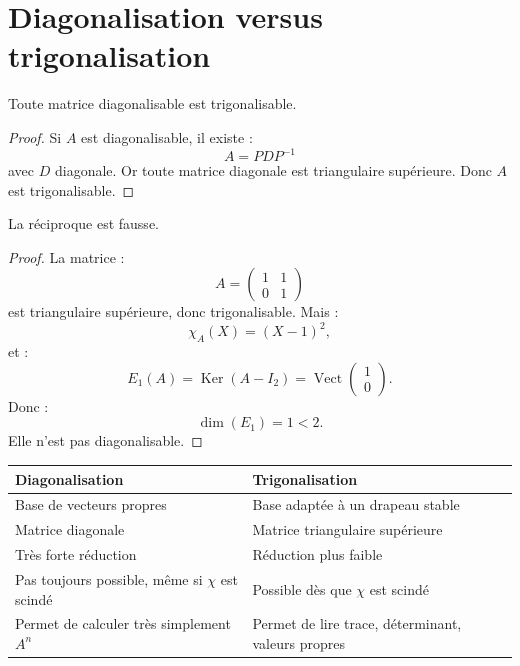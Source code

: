 \documentclass[11pt,a4paper]{article}
\newcommand{\Vect}{\operatorname{Vect}}
\newcommand{\Ker}{\operatorname{Ker}}
\begin{document}
\section{Diagonalisation versus trigonalisation}

\begin{theorembox}
Toute matrice diagonalisable est trigonalisable.
\end{theorembox}

\begin{proof}
Si \(A\) est diagonalisable, il existe :
\[
A=PDP^{-1}
\]
avec \(D\) diagonale.  
Or toute matrice diagonale est triangulaire supérieure.  
Donc \(A\) est trigonalisable.
\end{proof}

\begin{theorembox}
La réciproque est fausse.
\end{theorembox}

\begin{proof}
La matrice :
\[
A=
\begin{pmatrix}
1&1\\
0&1
\end{pmatrix}
\]
est triangulaire supérieure, donc trigonalisable.  
Mais :
\[
\chi_A(X)=(X-1)^2,
\]
et :
\[
E_1(A)=\Ker(A-I_2)=\Vect
\begin{pmatrix}
1\\0
\end{pmatrix}.
\]
Donc :
\[
\dim(E_1)=1<2.
\]
Elle n'est pas diagonalisable.
\end{proof}

\begin{center}
\begin{tabularx}{0.95\linewidth}{|X|X|}
\hline
\textbf{Diagonalisation} & \textbf{Trigonalisation}\\
\hline
Base de vecteurs propres & Base adaptée à un drapeau stable\\
\hline
Matrice diagonale & Matrice triangulaire supérieure\\
\hline
Très forte réduction & Réduction plus faible\\
\hline
Pas toujours possible, même si \(\chi\) est scindé & Possible dès que \(\chi\) est scindé\\
\hline
Permet de calculer très simplement \(A^n\) & Permet de lire trace, déterminant, valeurs propres\\
\hline
\end{tabularx}
\end{center}
\end{document}
